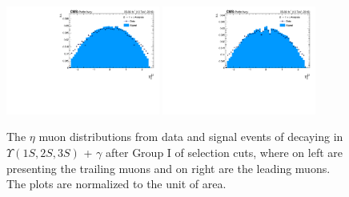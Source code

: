 \begin{figure}[!htbp]
\begin{center}
\includegraphics[width=0.45\textwidth]{figures_and_tables/outputPlots/ZtoUpsilon_Cat0_ZZZZZ/au/data_x_mc/noKinCuts/h_noKin_TrailingMu_eta}\hspace*{1.cm}
\includegraphics[width=0.45\textwidth]{figures_and_tables/outputPlots/ZtoUpsilon_Cat0_ZZZZZ/au/data_x_mc/noKinCuts/h_noKin_LeadingMu_eta}
\end{center}\vspace*{-.5cm}
\caption{The $\eta$ muon distributions from data and signal events of \Z decaying in $\Upsilon(1S,2S,3S)$ + $\gamma$ after Group I of selection cuts, where on left are presenting the trailing muons and on right are the leading muons. The plots are normalized to the unit of area.}
\label{fig:etaMuons_ZtoUpsilon_Cat0}
\end{figure}

